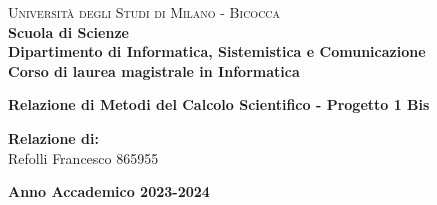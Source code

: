 \documentclass[a4paper,11pt,oneside, table]{article}
\begin{document}
    \begin{titlepage}
        \noindent
        \begin{minipage}[t]{0.19\textwidth}
        \end{minipage}
        \begin{minipage}[t]{0.81\textwidth}
        {
                {\textsc{Università degli Studi di Milano - Bicocca}} \\
                \textbf{Scuola di Scienze} \\
                \textbf{Dipartimento di Informatica, Sistemistica e Comunicazione} \\
                \textbf{Corso di laurea magistrale in Informatica} \\
                \par
        }
        \end{minipage}
    	\vspace{40mm}
    	\begin{center}
            {\LARGE{
                    \textbf{Relazione di Metodi del Calcolo Scientifico - Progetto 1 Bis}
                    \par
            }}
        \end{center}
        
        \vspace{50mm}
        
        \vspace{15mm}

        \begin{flushright}
            {\large \textbf{Relazione di:}} \\
            \large{Refolli Francesco}
            \large{865955}
        \end{flushright}
        
        \vspace{40mm}
        \begin{center}
            {\large{\bf Anno Accademico 2023-2024}}
        \end{center}
        \restoregeometry
    \end{titlepage}
\end{document}
